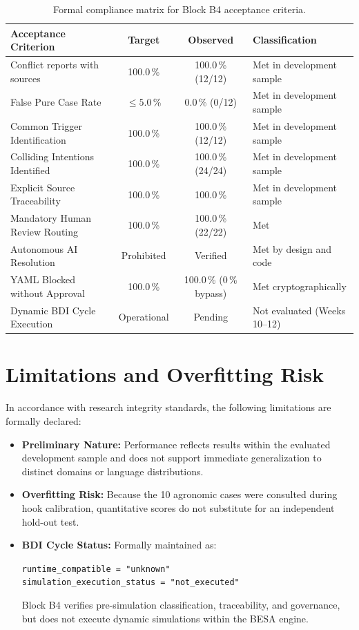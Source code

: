 \documentclass[11pt,a4paper]{article}
\begin{document}
\begin{table}[H]
\centering
\small
\caption{Formal compliance matrix for Block B4 acceptance criteria.}
\label{tab:compliance_b4_en}
\begin{tabularx}{\textwidth}{Xccp{4.8cm}}
\toprule
\textbf{Acceptance Criterion} & \textbf{Target} & \textbf{Observed} & \textbf{Classification} \\
\midrule
Conflict reports with sources & 100.0\,\% & 100.0\,\% (12/12) & Met in development sample \\
False Pure Case Rate & $\le 5.0$\,\% & 0.0\,\% (0/12) & Met in development sample \\
Common Trigger Identification & 100.0\,\% & 100.0\,\% (12/12) & Met in development sample \\
Colliding Intentions Identified & 100.0\,\% & 100.0\,\% (24/24) & Met in development sample \\
Explicit Source Traceability & 100.0\,\% & 100.0\,\% & Met in development sample \\
Mandatory Human Review Routing & 100.0\,\% & 100.0\,\% (22/22) & Met \\
Autonomous AI Resolution & Prohibited & Verified & Met by design and code \\
YAML Blocked without Approval & 100.0\,\% & 100.0\,\% (0\,\% bypass) & Met cryptographically \\
Dynamic BDI Cycle Execution & Operational & Pending & Not evaluated (Weeks 10--12) \\
\bottomrule
\end{tabularx}
\end{table}

\section{Limitations and Overfitting Risk}
In accordance with research integrity standards, the following limitations are formally declared:
\begin{itemize}[leftmargin=*]
    \item \textbf{Preliminary Nature:} Performance reflects results within the evaluated development sample and does not support immediate generalization to distinct domains or language distributions.
    \item \textbf{Overfitting Risk:} Because the 10 agronomic cases were consulted during hook calibration, quantitative scores do not substitute for an independent hold-out test.
    \item \textbf{BDI Cycle Status:} Formally maintained as:
    \begin{center}
        \texttt{runtime\_compatible = "unknown"} \\
        \texttt{simulation\_execution\_status = "not\_executed"}
    \end{center}
    Block B4 verifies pre-simulation classification, traceability, and governance, but does not execute dynamic simulations within the BESA engine.
\end{itemize}
\end{document}
